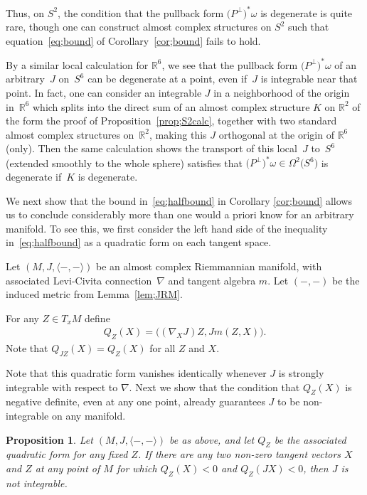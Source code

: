 \documentclass[pdftex]{sigma}
\newtheorem{prop}[thm]{Proposition}
{ \theoremstyle{definition} \newtheorem{defn}[thm]{Definition}
 \newtheorem{ex}[thm]{Example}
 \newtheorem{rmk}[thm]{Remark}}
\numberwithin{equation}{section}
\newcommand{\R}{\mathbb{R}}
\newcommand{\Om}{\Omega}
\begin{document}
Thus, on $S^2$, the condition that the pullback form $\big(P^\perp\big)^*\omega$ is degenerate is quite rare, though one can construct almost complex structures on $S^2$ such that equation~\eqref{eq;bound} of Corollary~\ref{cor;bound} fails to hold.

By a similar local calculation for $\R^6$, we see that the pullback form $\big(P^\perp\big)^*\omega$ of an arbitrary~$J$ on~$S^6$ can be degenerate at a point, even if~$J$ is integrable near that point. In fact, one can consider an integrable $J$ in a neighborhood of the origin in~$\R^6$ which splits into the direct sum of an almost complex structure $K$ on $\R^2$ of the form the proof of Proposition~\ref{prop;S2calc}, together with two standard almost complex structures on~$\R^2$, making this $J$ orthogonal at the origin of $\R^6$ (only). Then the same calculation shows the transport of this local~$J$ to~$S^6$ (extended smoothly to the whole sphere) satisfies that $\big(P^\perp\big)^*\omega \in \Om^2\big(S^6\big)$ is degenerate if~$K$ is degenerate.

We next show that the bound in~\eqref{eq;halfbound} in Corollary \ref{cor;bound} allows us to conclude considerably more than one would a priori know for an arbitrary manifold. To see this, we first consider the left hand side of the inequality in~\eqref{eq;halfbound} as a quadratic form on each tangent space.

\begin{defn}Let $(M,J, \langle - , - \rangle)$ be an almost complex Riemmannian manifold, with associated Levi-Civita connection~$\nabla$ and tangent algebra $m$. Let $( - , - )$ be the induced metric from Lemma~\ref{lem;JRM}.

For any $Z \in T_x M$ define
\begin{gather*}
Q_Z(X) = \big( (\nabla_X J) Z, J m(Z,X) \big) .
 \end{gather*}
 Note that $Q_{JZ}(X) = Q_Z(X) $ for all $Z$ and $X$.
 \end{defn}

Note that this quadratic form vanishes identically whenever $J$ is strongly integrable with respect to $\nabla$.
Next we show that the condition that $Q_Z(X)$ is negative definite, even at any one point, already guarantees $J$ to be non-integrable on any manifold.

 \begin{prop} Let $(M,J, \langle - , - \rangle)$ be as above, and let $Q_Z$ be the associated quadratic form
 for any fixed $Z$. If there are any two non-zero tangent vectors $X$ and $Z$ at any point of $M$ for which $Q_Z(X) < 0$ and $Q_Z(JX) < 0$, then $J$ is not integrable.
 \end{prop}
\end{document}
